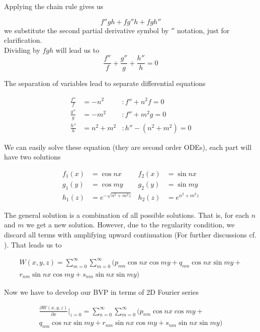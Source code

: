 Applying the chain rule gives us

\begin{equation}
f''gh + fg''h + fgh''
\end{equation}
we substitute the second partial derivative symbol by $''$ notation, just for clarification. 
\\
Dividing by $fgh$ will lead us to
\begin{equation}
\frac{f''}{f} + \frac{g''}{g} + \frac{h''}{h} = 0
\end{equation}

The separation of variables lead to separate differential equations

\begin{align}
\frac{f''}{f} &= -n^2 &: f'' + n^2f = 0 \\
\frac{g''}{g} &= -m^2 &: f'' + m^2g = 0 \\
\frac{h''}{h} &= n^2+m^2 &: h'' - (n^2+m^2) = 0
\end{align}

We can easily solve these equation (they are second order ODEs), each part will have two solutions

\begin{align*}
f_1(x) &= \cos nx  &f_2(x) &= \sin nx\\
g_1(y) &= \cos my  &g_2(y) &= \sin my \\
h_1(z) &= e^{-\sqrt{n^2+m^2z}}  &h_2(z) &= e^{n^2 + m^2z}
\end{align*}

The general solution is a combination of all possible solutions. That is, for each $n$ and $m$ we get a new solution. However, due to the regularity condition, we discard all terms with amplifying upward continuation (For further discussions cf. \cite{nico, hofmann}). That leads us to

\begin{multline}
W(x,y,z) = \sum_{m=0}^{\infty}\sum_{m=0}^{\infty} (p_{nm} \cos nx \cos my + q_{nm} \cos nx \sin my +\\ r_{nm} \sin nx \cos my + s_{nm} \sin nx \sin my)
\end{multline}

Now we have to develop our BVP in terms of 2D Fourier series

\begin{multline}
\frac{\partial W (x,y,z)}{\partial x}\Big|_{z=0} = \sum_{n=0}^{\infty}\sum_{m=0}^{\infty} (p_{nm} \cos nx \cos my +\\ q_{nm} \cos nx \sin my + r_{nm} \sin nx \cos my + s_{nm} \sin nx \sin my)
\end{multline}


